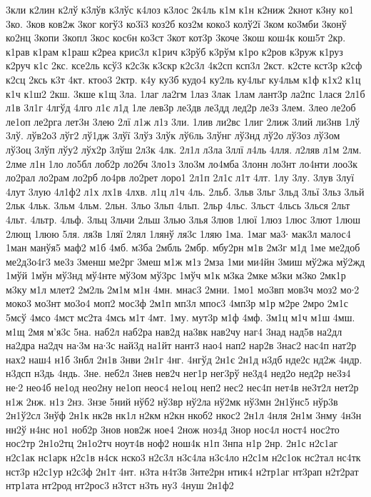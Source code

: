 {3кли
к2лин
к2лў
к3лўв
к3лўс
к4лоз
к3лос
2к4ль
к1м
к1н
к2ниж
2кнот
к3ну
ко1
3ко.
3ков
ков2ж
3ког
когў3
ко3ї3
коз2б
коз2м
коко3
колў2ї
3ком
ко3мби
3конў
ко2нц
3копи
3копл
3кос
кос6н
ко3ст
3кот
кот3р
3коче
3кош
кош4к
кош5т
2кр.
к1рав
к1рам
к1раш
к2реа
крис3л
к1рич
к3рўб
к3рўм
к1ро
к2ров
к3руж
к1руз
к2руч
к1с
2кс.
ксе2ль
ксў3
к2с3к
к3скр
к2с3л
4к2сп
ксп3л
2кст.
к2сте
кст3р
к2сф
к2сц
2ксь
к3т
4кт.
ктоо3
2ктр.
к4у
ку3б
кудо4
ку2ль
ку4льг
ку4льм
к1ф
к1х2
к1ц
к1ч
к1ш2
2кш.
3кше
к1щ
3ла.
1лаг
ла2гм
1лаз
3лак
1лам
лант3р
ла2пс
1лася
2л1б
л1в
3л1г
4лгўд
4лго
л1є
л1д
1ле
лев3р
ле3дв
ле3дд
лед2р
ле3з
3лем.
3лео
ле2об
ле1оп
ле2рга
лет3н
3лею
2лї
л1ж
л1з
3ли.
1лив
ли2вс
1лиг
2лиж
3лий
ли3нв
1лў
3лў.
лўв2о3
лўг2
лў1дж
3лўї
3лўз
3лўк
лў6ль
3лўнг
лў3нд
лў2о
лў3оз
лў3ом
лў3оц
3лўп
лўу2
лўх2р
3лўш
2л3к
4лк.
2л1л
л3ла
3ллї
л4ль
4лля.
л2ляв
л1м
2лм.
2лме
л1н
1ло
ло5бл
лоб2р
ло2бч
3ло1з
3ло3м
ло4мба
3лонн
ло3нт
ло4нти
лоо3к
ло2рал
ло2рам
ло2рб
ло4рв
ло2рет
лоро1
2л1п
2л1с
л1т
4лт.
1лу
3лу.
3лув
3луї
4лут
3лую
4л1ф2
л1х
лх1в
4лхв.
л1ц
л1ч
4ль.
2льб.
3льв
3льг
3льд
3льї
3льз
3льй
2льк
4льк.
3льм
4льм.
2льн.
3льо
3льп
4льп.
2льр
4льс.
3льст
4льсь
3лься
2льт
4льт.
4льтр.
4льф.
3льц
3льчи
2льш
3лью
3лья
3люв
1люї
1люз
1люс
3лют
1люш
2лющ
1люю
5ля.
ля3в
1ляї
2лял
1лянў
ля3с
1ляю
1ма.
1маг
ма3∙
мак3л
малос4
1ман
манўя5
маф2
м1б
4мб.
м3ба
2мбль
2мбр.
мбу2рн
м1в
2м3г
м1д
1ме
ме2доб
ме2д3о4г3
ме3з
3менш
ме2рг
3меш
м1ж
м1з
2мза
1ми
ми4йн
3миш
мў2жа
мў2жд
1мўй
1мўн
мў3нд
мў4нте
мў3ом
мў3рс
1мўч
м1к
м3ка
2мке
м3ки
м3ко
2мк1р
м3ку
м1л
млет2
2м2ль
2м1м
м1н
4мн.
мнас3
2мни.
1мо1
мо3вп
мов3ч
моз2
мо∙2
моко3
мо3нт
мо3о4
моп2
мос3ф
2м1п
мп3л
мпос3
4мп3р
м1р
м2ре
2мро
2м1с
5мсў
4мсо
4мст
мс2та
4мсь
м1т
4мт.
1му.
мут3р
м1ф
4мф.
3м1ц
м1ч
м1ш
4мш.
м1щ
2мя
м'я3с
5на.
наб2л
наб2ра
нав2д
на3вк
нав2чу
наг4
3над
над5в
на2дл
на2дра
на2дч
на∙3м
на∙3с
най3д
на1йт
нант3
нао4
нап2
нар2в
3нас2
нас4п
нат2р
нах2
наш4
н1б
3нбл
2н1в
3нви
2н1г
4нг.
4нгўд
2н1є
2н1д
н3дб
нде2с
нд2ж
4ндр.
н3дсп
н3дь
4ндь.
3не.
неб2л
3нев
нев2ч
нег1р
нег3рў
не3д4
нед2о
нед2р
не3з4
не∙2
нео4б
не1од
нео2ну
не1оп
неос4
не1оц
неп2
нес2
нес4п
нет4в
не3т2л
нет2р
н1ж
2нж.
н1з
2нз.
3нзе
5ний
нўб2
нў3вр
нў2ла
нў2мк
нў3мн
2н1ўнс5
нўр3в
2н1ў2сл
3нўф
2н1к
нк2в
нк1л
н2км
н2кн
нкоб2
нкос2
2н1л
4нля
2н1м
3нму
4н3н
нн2ў
н4нс
но1
ноб2р
3нов
нов2ж
ное4
2нож
ноз4д
3нор
нос4л
ност4
нос2то
нос2тр
2н1о2тц
2н1о2тч
ноут4в
ноф2
нош4к
н1п
3нпа
н1р
2нр.
2н1с
н2с1аг
н2с1ак
нс1арк
н2с1в
н4ск
нско3
н2с3л
н3с4ла
н3с4ло
н2с1м
н2с1ок
нс2тал
нс4тк
нст3р
н2с1ур
н2с3ф
2н1т
4нт.
н3та
н4т3в
3нте2рн
нтик4
н2тр1аг
нт3рап
н2т2рат
нтр1ата
нт2род
нт2рос3
н3тст
н3ть
ну3
4нуш
2н1ф2
}
